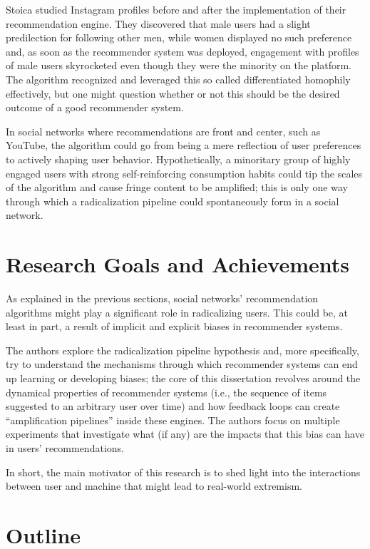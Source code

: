 Stoica \citep{stoica_algorithmic_2018} studied Instagram profiles before and
after the implementation of their recommendation engine. They discovered that
male users had a slight predilection for following other men, while women
displayed no such preference and, as soon as the recommender system was
deployed, engagement with profiles of male users skyrocketed even though they
were the minority on the platform. The algorithm recognized and leveraged this
so called differentiated homophily effectively, but one might question whether
or not this should be the desired outcome of a good recommender system.

In social networks where recommendations are front and center, such as YouTube,
the algorithm could go from being a mere reflection of user preferences to
actively shaping user behavior. Hypothetically, a minoritary group of highly
engaged users with strong self-reinforcing consumption habits could tip the
scales of the algorithm and cause fringe content to be amplified; this is only
one way through which a radicalization pipeline could spontaneously form in a
social network.

\section{Research Goals and Achievements}
\label{sec:research_goals}

As explained in the previous sections, social networks' recommendation
algorithms might play a significant role in radicalizing users. This could be,
at least in part, a result of implicit and explicit biases in recommender
systems.

The authors explore the radicalization pipeline hypothesis and, more
specifically, try to understand the mechanisms through which recommender systems
can end up learning or developing biases; the core of this dissertation revolves
around the dynamical properties of recommender systems (i.e., the sequence of
items suggested to an arbitrary user over time) and how feedback loops can
create ``amplification pipelines'' inside these engines. The authors focus on
multiple experiments that investigate what (if any) are the impacts that this
bias can have in users' recommendations.

In short, the main motivator of this research is to shed light into the
interactions between user and machine that might lead to real-world extremism.

\section{Outline}
\label{sec:outline}

